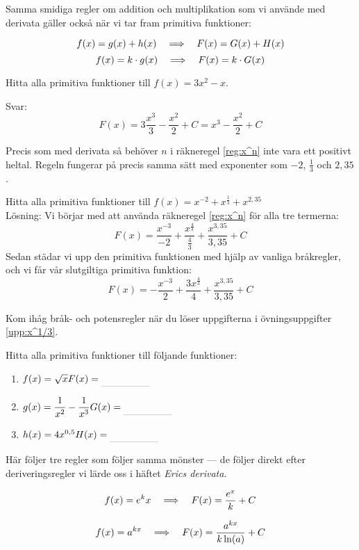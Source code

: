 \documentclass[a4paper, 12pt]{article}
\begin{document}
Samma smidiga regler om addition och multiplikation som vi använde med derivata gäller också när vi tar fram primitiva funktioner:
\begin{regel}
    \[f(x) = g(x) + h(x) \hspace{1em} \Longrightarrow \hspace{1em} F(x) = G(x) + H(x)\]
    \[f(x) = k\cdot g(x) \hspace{1em} \Longrightarrow \hspace{1em} F(x) = k\cdot G(x)\]
\end{regel}


\begin{exempel}
    Hitta alla primitiva funktioner till $f(x) = 3x^2 - x$.

    Svar: \[F(x) = 3\dfrac {x^3}3 - \dfrac {x^2}2  + C= x^3 - \dfrac {x^2}2 + C\]
\end{exempel}

Precis som med derivata så behöver $n$ i räkneregel \ref{reg:x^n} inte vara ett positivt heltal. Regeln fungerar på precis samma sätt med exponenter som $-2$, $\frac 13$ och $2,35$.


\begin{exempel}
    Hitta alla primitiva funktioner till $f(x) = x^{-2} + x^\frac{1}{3} + x^{2,35}$
    \\Lösning:
    Vi börjar med att använda räkneregel \ref{reg:x^n} för alla tre termerna:
    \[F(x) = \dfrac {x^{-3}}{-2} + \dfrac {x^\frac{4}{3}}{\frac{4}{3}} + \dfrac {x^{3,35}}{3,35} + C \]
    Sedan städar vi upp den primitiva funktionen med hjälp av vanliga bråkregler, och vi får vår slutgiltiga primitiva funktion:
    \[F(x) = - \dfrac {x^{-3}}{2} + \dfrac {3x^\frac{4}{3}}{4} + \dfrac {x^{3,35}}{3,35} + C\]
\end{exempel}

Kom ihåg bråk- och potensregler när du löser uppgifterna i övningsuppgifter \ref{upp:x^1/3}.

\begin{uppgifter}
    \label{upp:x^1/3}
    Hitta alla primitiva funktioner till följande funktioner: 
    \begin{multicols}{3}
        \begin{enumerate}
            \item $f(x) = \sqrt{x} \\ F(x) \ans$
            \item $g(x) = \dfrac 1{x^2} - \dfrac 1{x^{3}} \\ G(x) \ans$
            \item $h(x) = 4x^{0,5} \\ H(x) \ans$
        \end{enumerate}
    \end{multicols}
\end{uppgifter}

Här följer tre regler som följer samma mönster --- de följer direkt efter deriveringsregler vi lärde oss i häftet \emph{Erics derivata}.

\begin{regel}
    \[f(x) = e^kx \hspace{1em} \Longrightarrow \hspace{1em} F(x) = \dfrac{e^x}k + C\]
\end{regel}

\begin{regel}
    \[f(x) = a^{kx} \hspace{1em} \Longrightarrow \hspace{1em} F(x) = \dfrac{a^{kx}}{k\ln(a)} + C\]
\end{regel}
\end{document}

